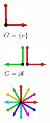 \begin{figure}[htbp]
	\centering
	\begin{subfigure}[b]{0.22\textwidth}
		\centering
		\includegraphics[width=0.8\linewidth]{figures/GpM_trivial.pdf}
		\caption{\small $G=\{e\}$}
		\label{fig:GpM_a}
	\end{subfigure}
	\hfill
	\begin{subfigure}[b]{0.22\textwidth}
		\centering
		\includegraphics[width=0.8\linewidth]{figures/GpM_reflect.pdf}
		\caption{\small $G=\mathscr{R}$}
		\label{fig:GpM_b}
	\end{subfigure}
	\hfill
	\begin{subfigure}[b]{0.22\textwidth}
		\centering
		\includegraphics[width=0.8\linewidth]{figures/GpM_SO2.pdf}

\end{subfigure}
\end{figure}
